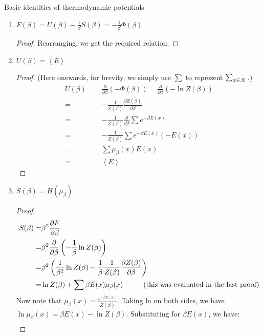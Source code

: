 \documentclass[letterpaper,english,12pt]{article}
\begin{document}
\begin{lem} Basic identities of thermodynamic potentials
\begin{enumerate}
\item $F(\beta)=U(\beta)-\frac{1}{\beta}S(\beta)=-\frac{1}{\beta} \Phi(\beta)$
\begin{proof}
Rearranging, we get the required relation.
\end{proof}
\item $U(\beta)=\left\langle E \right\rangle$ 
\begin{proof}
(Here onewards, for brevity, we simply use $\sum$ to represent $\sum_{x \in \mathscr{X}}$.)
\begin{align*}
U(\beta)=&\frac{\partial}{\partial \beta}\left(-\Phi(\beta) \right)=\frac{\partial}{\partial \beta}(- \ln Z(\beta)) \\
=&-\frac{1}{Z(\beta)} \frac{\partial Z(\beta)}{\partial \beta}\\
=&-\frac{1}{Z(\beta)} \frac{\partial}{\partial \beta} \sum e^{-\beta E(x)}\\
=&-\frac{1}{Z(\beta)} \sum e^{-\beta E(x)} (-E(x))\\
=&\sum \mu_{\beta}(x) E(x)\\
=&\left\langle E \right\rangle
\end{align*}
\end{proof}
\item $S(\beta)=H(\mu_\beta)$
\begin{proof}
\begin{align*}
S(\beta)=&\beta^2 \frac{\partial F}{\partial \beta}\\
=&\beta^2 \frac{\partial }{\partial \beta} \left(-\frac{1}{\beta} \ln Z(\beta) \right)\\
=& \beta^2 \left( \frac{1}{\beta^2} \ln Z(\beta) - \frac{1}{\beta }\frac{1}{Z(\beta)}\frac{\partial Z(\beta)}{\partial \beta} \right) \\
=& \ln Z(\beta) +\sum \beta E(x) \mu_\beta (x) \hspace{10mm} \text{(this was evaluated in the last proof)} \\
\end{align*}
Now note that $\mu_{\beta}(x)=\frac{e^{-\beta E(x)}}{Z(\beta)}$. Taking ln on both sides, we have $\ln \mu_\beta(x)=\beta E(x)-\ln Z(\beta)$. Substituting for $\beta E(x)$, we have:
\begin{align*}

\end{align*}
\end{proof}
\end{enumerate}
\end{lem}
\end{document}
